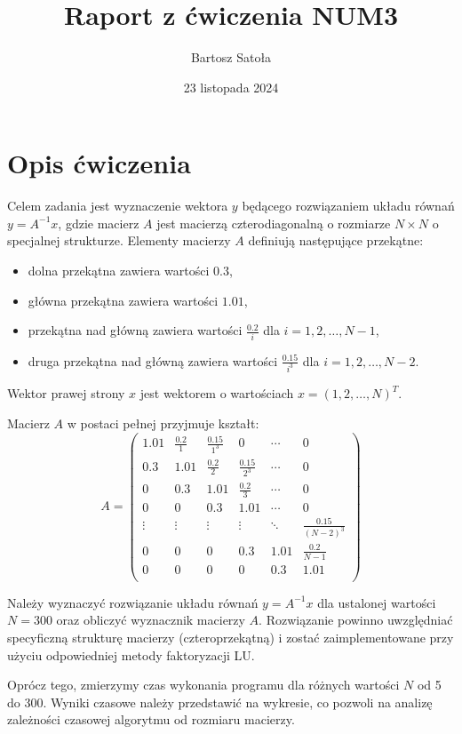 \documentclass[a4paper,12pt]{article}
\title{Raport z ćwiczenia NUM3}
\author{Bartosz Satoła}
\date{23 listopada 2024}
\begin{document}
\maketitle

\section{Opis ćwiczenia}

Celem zadania jest wyznaczenie wektora $y$ będącego rozwiązaniem układu równań $y = A^{-1}x$, gdzie macierz $A$ jest macierzą czterodiagonalną o rozmiarze $N \times N$ o specjalnej strukturze. Elementy macierzy $A$ definiują następujące przekątne:
\begin{itemize}
    \item dolna przekątna zawiera wartości $0.3$,
    \item główna przekątna zawiera wartości $1.01$,
    \item przekątna nad główną zawiera wartości $\frac{0.2}{i}$ dla $i = 1, 2, \dots, N-1$,
    \item druga przekątna nad główną zawiera wartości $\frac{0.15}{i^3}$ dla $i = 1, 2, \dots, N-2$.
\end{itemize}

Wektor prawej strony $x$ jest wektorem o wartościach $x = (1, 2, \dots, N)^T$.

Macierz $A$ w postaci pełnej przyjmuje kształt:
\[
A =
\begin{pmatrix}
1.01 & \frac{0.2}{1} & \frac{0.15}{1^3} & 0 & \cdots & 0 \\
0.3 & 1.01 & \frac{0.2}{2} & \frac{0.15}{2^3} & \cdots & 0 \\
0 & 0.3 & 1.01 & \frac{0.2}{3} & \cdots & 0 \\
0 & 0 & 0.3 & 1.01 & \cdots & 0 \\
\vdots & \vdots & \vdots & \vdots & \ddots & \frac{0.15}{(N-2)^3} \\
0 & 0 & 0 & 0.3 & 1.01 & \frac{0.2}{N-1} \\
0 & 0 & 0 & 0 & 0.3 & 1.01 \\
\end{pmatrix}
\]

Należy wyznaczyć rozwiązanie układu równań $y = A^{-1}x$ dla ustalonej wartości $N = 300$ oraz obliczyć wyznacznik macierzy $A$. Rozwiązanie powinno uwzględniać specyficzną strukturę macierzy (czteroprzekątną) i zostać zaimplementowane przy użyciu odpowiedniej metody faktoryzacji LU.

Oprócz tego, zmierzymy czas wykonania programu dla różnych wartości $N$ od 5 do 300. Wyniki czasowe należy przedstawić na wykresie, co pozwoli na analizę zależności czasowej algorytmu od rozmiaru macierzy.
\end{document}
